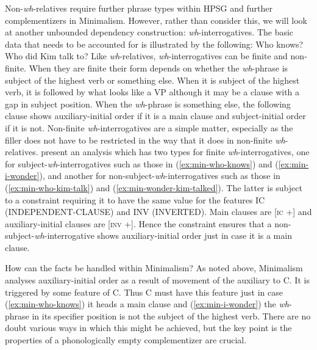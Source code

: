 \documentclass[output=paper]{langsci/langscibook}
\begin{document}
Non-\textit{wh}-relatives require further phrase types within HPSG and further complementizers in
Minimalism. However, rather than consider this, we will look at another unbounded dependency
construction: \textit{wh}-interrogatives. The basic data that needs to be accounted for is
illustrated by the following: 
\eal
\ex Who knows? \label{ex:min-who-knows}
\label{ex:min-i-wonder}
\ex Who did Kim talk to? \label{ex:min-who-kim-talk}
\label{ex:min-wonder-kim-talked}
\label{ex:min-wonder-who-talk}
\zl 
Like \textit{wh}-relatives, \textit{wh}-interrogatives can be finite and non-finite. When they are finite their form depends on whether the \textit{wh}-phrase is subject of the highest verb or something else. When it is subject of the highest verb, it is followed by what looks like a VP although it may be a clause with a gap in subject position. When the \textit{wh}-phrase is something else, the following clause shows auxiliary-initial order if it is a main clause and subject-initial order if it is not. Non-finite \textit{wh}-interrogatives are a simple matter, especially as the filler does not have to be restricted in the way that it does in non-finite \textit{wh}-relatives. \citet{GSag2000a-u} present an analysis which has two types for finite \textit{wh}-interrogatives, one for subject-\textit{wh}-interrogatives such as those in (\ref{ex:min-who-knows}) and (\ref{ex:min-i-wonder}), and another for non-subject-\textit{wh}-interrogatives such as those in (\ref{ex:min-who-kim-talk}) and (\ref{ex:min-wonder-kim-talked}). The latter is subject to a constraint requiring it to have the same value for the features IC (INDEPENDENT-CLAUSE) and INV (INVERTED). Main clauses are [\textsc{ic} +] and auxiliary-initial clauses are [\textsc{inv} +]. Hence the constraint ensures that a non-subject-\textit{wh}-interrogative shows auxiliary-initial order just in case it is a main clause.

How can the facts be handled within Minimalism? As noted above, Minimalism analyses
auxiliary-initial order as a result of movement of the auxiliary to C. It is triggered by some
feature of C. Thus C must have this feature just in case (\ref{ex:min-who-knows}) it heads a main
clause and (\ref{ex:min-i-wonder}) the \textit{wh}-phrase in its specifier position is not the
subject of the highest verb. There are no doubt various ways in which this might be achieved, but
the key point is the properties of a phonologically empty complementizer are
crucial.
\end{document}
